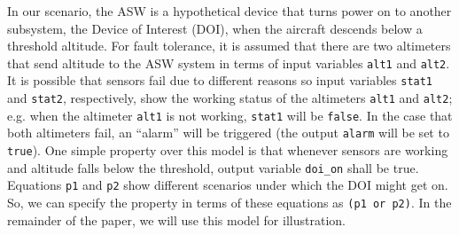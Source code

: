 In our scenario, the ASW is a hypothetical device that turns power on to another subsystem, the Device of Interest (DOI), when the aircraft descends below a threshold altitude.
For fault tolerance, it is assumed that there are two altimeters that send altitude to the ASW system in terms of input variables \texttt{alt1} and \texttt{alt2}.
It is possible that sensors fail due to different reasons so input variables \texttt{stat1} and \texttt{stat2}, respectively, show the working status of the altimeters \texttt{alt1} and \texttt{alt2}; e.g. when the altimeter \texttt{alt1} is not working, \texttt{stat1} will be \texttt{false}. In the case that both altimeters fail, an ``alarm'' will be triggered (the output \texttt{alarm} will be set to \texttt{true}).
One simple property over this model is that whenever sensors are working and altitude falls below the threshold, output variable \texttt{doi\_on} shall be true. Equations \texttt{p1} and \texttt{p2} show different scenarios under which the DOI might get on. So, we can specify the property in terms of these equations as \texttt{(p1 or p2)}.
In the remainder of the paper, we will use this model for illustration.

